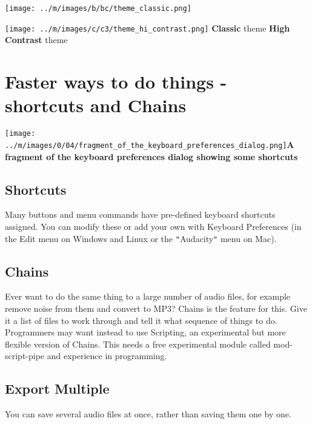 \documentclass[twocolumn]{book}
\begin{document}

\* \* \* \* \par\texttt{[image: ../m/images/b/bc/theme\_classic.png]}
\* \* \* \* \par\texttt{[image: ../m/images/c/c3/theme\_hi\_contrast.png]}
\* \* \* \* 
\textbf{Classic} theme
\* \* \* \* 
\textbf{High Contrast} theme




\section{Faster ways to do things - shortcuts and Chains}

\par\texttt{[image: ../m/images/0/04/fragment\_of\_the\_keyboard\_preferences\_dialog.png]}\textbf{A fragment of the keyboard preferences dialog showing some shortcuts}

\subsection{Shortcuts}


Many buttons and menu commands have pre-defined keyboard shortcuts assigned.  You can modify these or add your own with Keyboard Preferences (in the Edit menu on Windows and Linux or the \texttt{{}"{}}Audacity\texttt{{}"{}} menu on Mac). 

\subsection{Chains}


Ever want to do the same thing to a large number of audio files, for example remove noise from them and convert to MP3?  Chains is the feature for this. Give it a list of files to work through and tell it what sequence of things to do. Programmers may want instead to use Scripting, an experimental but more flexible version of Chains. This needs a free experimental module called mod-script-pipe and experience in programming.

\subsection{Export Multiple}


You can save several audio files at once, rather than saving them one by one.
\end{document}
